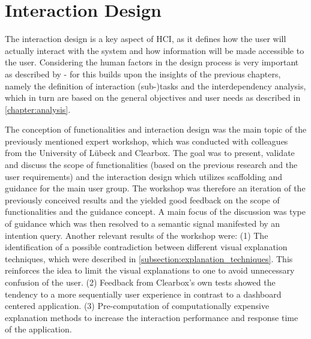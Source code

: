 \documentclass[11pt,a4paper,english]{scrreprt}
\begin{document}
\section{Interaction Design}\label{section:interaction_design}
The interaction design is a key aspect of HCI, as it defines how the user will actually interact with the system and how information will be made accessible to the user. Considering the human factors in the design process is very important as described by \textcite{wickens_2016_engineering} - for this builds upon the insights of the previous chapters, namely the definition of interaction (sub-)tasks and the interdependency analysis, which in turn are based on the general objectives and user needs as described in \autoref{chapter:analysis}.

The conception of functionalities and interaction design was the main topic of the previously mentioned expert workshop, which was conducted with colleagues from the University of Lübeck and Clearbox. The goal was to present, validate and discuss the scope of functionalities (based on the previous research and the user requirements) and the interaction design which utilizes scaffolding and guidance for the main user group. The workshop was therefore an iteration of the previously conceived results and the yielded good feedback on the scope of functionalities and the guidance concept. A main focus of the discussion was type of guidance which was then resolved to a semantic signal manifested by an intention query. Another relevant results of the workshop were: (1) The identification of a possible contradiction between different visual explanation techniques, which were described in \autoref{subsection:explanation_techniques}. This reinforces the idea to limit the visual explanations to one to avoid unnecessary confusion of the user. (2) Feedback from Clearbox's own tests showed the tendency to a more sequentially user experience in contrast to a dashboard centered application. (3) Pre-computation of computationally expensive explanation methods to increase the interaction performance and response time of the application.
\end{document}
